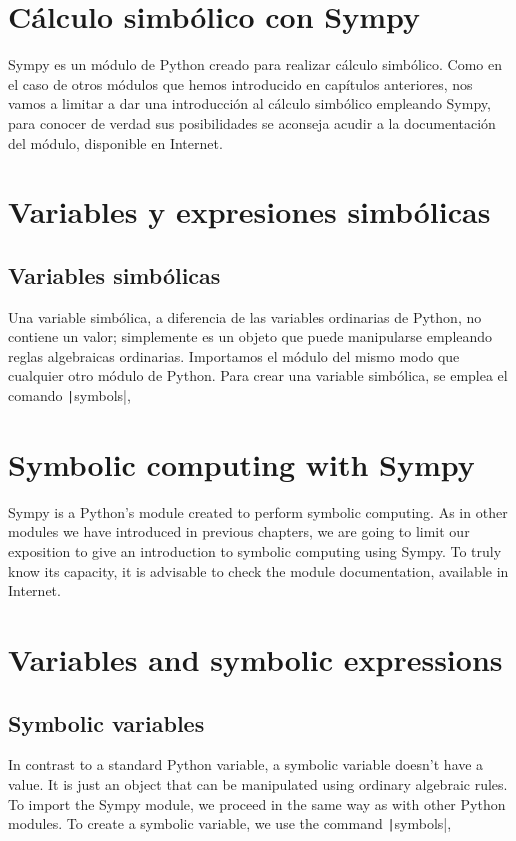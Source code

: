 \begin{paracol}{2}
\section{Cálculo simbólico con Sympy}
Sympy  es un módulo de Python creado para realizar cálculo simbólico. Como en el caso de otros módulos que hemos introducido en capítulos anteriores, nos vamos a limitar a dar una introducción al cálculo simbólico empleando Sympy, para conocer de verdad sus posibilidades se aconseja acudir a la documentación del módulo, disponible en Internet.

\section{Variables y expresiones simbólicas}
\subsection{Variables simbólicas} 
Una variable simbólica, a diferencia de las variables ordinarias de Python, no contiene un valor; simplemente es un objeto que puede manipularse empleando reglas  algebraicas ordinarias. Importamos el módulo del mismo modo que cualquier otro módulo de Python. Para crear una variable simbólica, se emplea el comando \texttt|symbols|,
\switchcolumn

\section{Symbolic computing with Sympy }
Sympy is a Python's module created to perform symbolic computing. As in other modules we have introduced in previous chapters, we are going to limit our exposition to give an introduction to symbolic computing using Sympy. To truly know its capacity, it is advisable to check the module documentation, available in Internet.

\section{Variables and symbolic expressions}
\subsection{Symbolic variables} 
In contrast to a standard Python variable, a symbolic variable doesn't have a value. It is just an object that can be manipulated using ordinary algebraic rules. To import the Sympy module, we proceed in the same way as with other Python modules. To create a symbolic variable, we use the command \texttt|symbols|,


\end{paracol}
